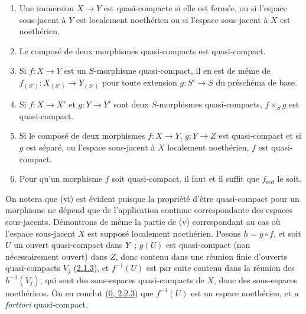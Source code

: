 \begin{proposition}[6.6.4]
\label{I.6.6.4-fr}
\begin{enumerate}
  \item[(i)] Une immersion $X\to Y$ est quasi-compacte si elle est fermée,
    ou si l'espace sous-jacent à $Y$ est localement noethérien ou si l'espace
    sous-jacent à $X$ est noethérien.
  \item[(ii)] Le composé de deux morphismes quasi-compacts est quasi-compact.
  \item[(iii)] Si $f:X\to Y$ est un $S$-morphisme quasi-compact, il en est de
    même de $f_{(S')}:X_{(S')}\to Y_{(S')}$ pour toute extension $g:S'\to S$
    du préschéma de base.
  \item[(iv)] Si $f:X\to X'$ et $g:Y\to Y'$ sont deux $S$-morphismes
    quasi-compacts, $f\times_S g$ est quasi-compact.
  \item[(v)] Si le composé de deux morphismes $f:X\to Y$, $g:Y\to Z$ est
    quasi-compact et si $g$ est séparé, ou l'espace sous-jacent à $X$
    localement noethérien, $f$ est quasi-compact.
  \item[(vi)] Pour qu'un morphisme $f$ soit quasi-compact, il faut et il
    suffit que $f_{\mathrm{red}}$ le soit.
\end{enumerate}
\end{proposition}

On notera que (vi) est évident puisque la propriété d'être quasi-compact pour
un morphisme ne dépend que de l'application continue correspondante des
espaces sous-jacents. Démontrons de même la partie de (v) correspondant au cas
où l'espace sous-jacent $X$ est supposé localement noethérien. Posons
$h=g\circ f$, et soit $U$ un ouvert quasi-compact dans $Y$~; $g(U)$ est
quasi-compact (non nécessairement ouvert) dans $Z$, donc contenu dans une
réunion finie d'ouverts quasi-compacts $V_j$
(\hyperref[I.2.1.3-fr]{2.1.3}), et $f^{-1}(U)$ est par suite contenu dans la
réunion des $h^{-1}(V_j)$, qui sont des sous-espaces quasi-compacts de $X$,
donc des sous-espaces noethériens. On en conclut
(\hyperref[0.2.2.3-fr]{0, 2.2.3}) que $f^{-1}(U)$ est un espace noethérien,
et \emph{a fortiori} quasi-compact.

